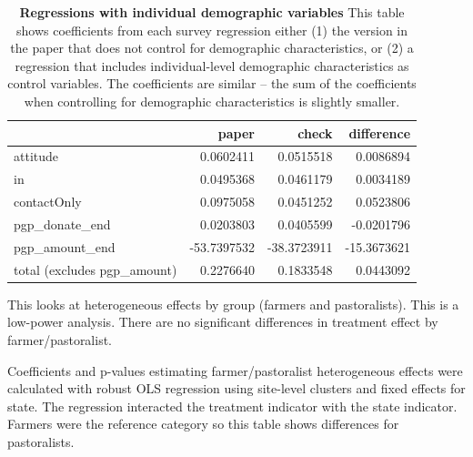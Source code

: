 \documentclass[
]{article}
\begin{document}
\begin{table}[H]
\begin{center}
\label{tab:comp_df_ind1}
\caption{\textbf{Regressions with individual demographic variables} This table shows coefficients from each survey regression either (1) the version in the paper that does not control for demographic characteristics, or (2) a regression that includes individual-level demographic characteristics as control variables. The coefficients are similar -- the sum of the coefficients when controlling for demographic characteristics is slightly smaller.}
\smallskip

\begin{tabular}{l|r|r|r}
\hline
  & paper & check & difference\\
\hline
attitude & 0.0602411 & 0.0515518 & 0.0086894\\
\hline
in & 0.0495368 & 0.0461179 & 0.0034189\\
\hline
contactOnly & 0.0975058 & 0.0451252 & 0.0523806\\
\hline
pgp\_donate\_end & 0.0203803 & 0.0405599 & -0.0201796\\
\hline
pgp\_amount\_end & -53.7397532 & -38.3723911 & -15.3673621\\
\hline
total (excludes pgp\_amount) & 0.2276640 & 0.1833548 & 0.0443092\\
\hline
\end{tabular}


\end{center}
\end{table}

This looks at heterogeneous effects by group (farmers and pastoralists).
This is a low-power analysis. There are no significant differences in
treatment effect by farmer/pastoralist.

Coefficients and p-values estimating farmer/pastoralist heterogeneous
effects were calculated with robust OLS regression using site-level
clusters and fixed effects for state. The regression interacted the
treatment indicator with the state indicator. Farmers were the reference
category so this table shows differences for pastoralists.
\end{document}
